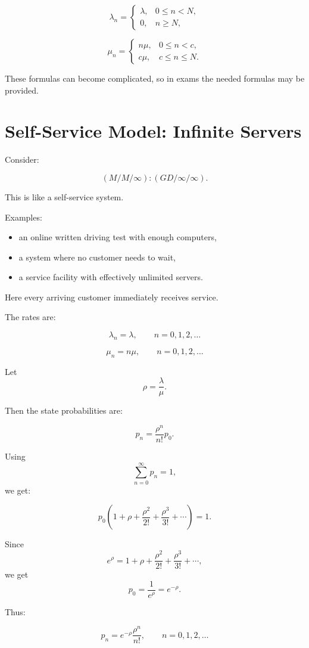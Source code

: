 \documentclass[12pt]{article}
\begin{document}
\[
\lambda_n=
\begin{cases}
\lambda, & 0\leq n<N,\\
0, & n\geq N,
\end{cases}
\]

\[
\mu_n=
\begin{cases}
n\mu, & 0\leq n<c,\\
c\mu, & c\leq n\leq N.
\end{cases}
\]

These formulas can become complicated, so in exams the needed formulas may be provided.

\section{Self-Service Model: Infinite Servers}

Consider:

\[
(M/M/\infty):(GD/\infty/\infty).
\]

This is like a self-service system.

Examples:

\begin{itemize}
    \item an online written driving test with enough computers,
    \item a system where no customer needs to wait,
    \item a service facility with effectively unlimited servers.
\end{itemize}

Here every arriving customer immediately receives service.

The rates are:

\[
\lambda_n=\lambda,\qquad n=0,1,2,\ldots
\]

\[
\mu_n=n\mu,\qquad n=0,1,2,\ldots
\]

Let
\[
\rho=\frac{\lambda}{\mu}.
\]

Then the state probabilities are:

\[
p_n=\frac{\rho^n}{n!}p_0.
\]

Using
\[
\sum_{n=0}^{\infty}p_n=1,
\]
we get:

\[
p_0\left(1+\rho+\frac{\rho^2}{2!}+\frac{\rho^3}{3!}+\cdots\right)=1.
\]

Since
\[
e^\rho=1+\rho+\frac{\rho^2}{2!}+\frac{\rho^3}{3!}+\cdots,
\]
we get
\[
p_0=\frac{1}{e^\rho}=e^{-\rho}.
\]

Thus:

\[
\boxed{
p_n=e^{-\rho}\frac{\rho^n}{n!},\qquad n=0,1,2,\ldots
}
\]
\end{document}
